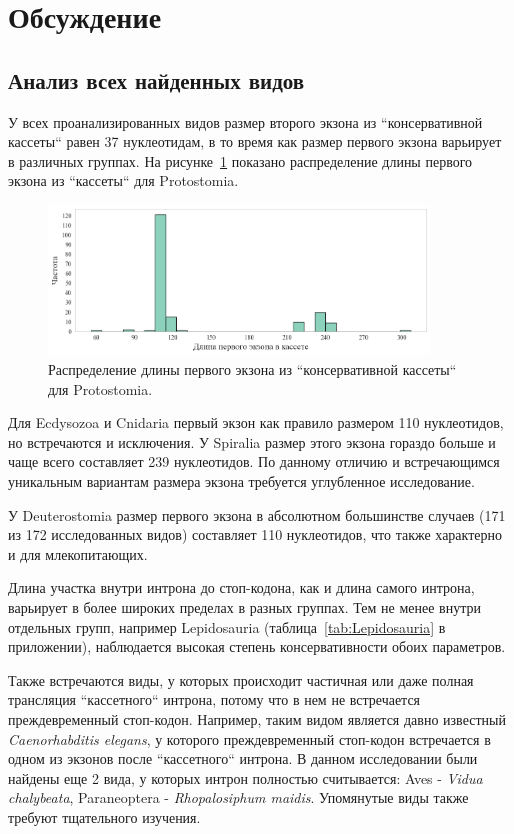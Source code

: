 \clearpage
\section{Обсуждение}

\subsection{Анализ всех найденных видов}

У всех проанализированных видов размер второго экзона из ``консервативной кассеты`` равен 37 нуклеотидам, в то время как размер первого экзона варьирует в различных группах.
На рисунке~\ref{fig:Protostomia_exon} показано распределение длины первого экзона из ``кассеты`` для Protostomia.

\begin{figure}[h] %
    \centering
    \includegraphics[width=0.9\textwidth]{images/Protostomia_exon}
    \caption{Распределение длины первого экзона из ``консервативной кассеты`` для Protostomia.}
    \label{fig:Protostomia_exon}
\end{figure}

Для Ecdysozoa и Cnidaria первый экзон как правило размером 110 нуклеотидов, но встречаются и исключения.
У Spiralia размер этого экзона гораздо больше и чаще всего составляет 239 нуклеотидов.
По данному отличию и встречающимся уникальным вариантам размера экзона требуется углубленное исследование.

У Deuterostomia размер первого экзона в абсолютном большинстве случаев (171 из 172 исследованных видов) составляет 110 нуклеотидов, что также характерно и для млекопитающих.

Длина участка внутри интрона до стоп-кодона, как и длина самого интрона, варьирует в более широких пределах в разных группах.
Тем не менее внутри отдельных групп, например Lepidosauria (таблица~\ref{tab:Lepidosauria} в приложении), наблюдается высокая степень консервативности обоих параметров.

Также встречаются виды, у которых происходит частичная или даже полная трансляция ``кассетного`` интрона, потому что в нем не встречается преждевременный стоп-кодон.
Например, таким видом является давно известный \textit{Caenorhabditis elegans}, у которого преждевременный стоп-кодон встречается в одном из экзонов после ``кассетного`` интрона.
В данном исследовании были найдены еще 2 вида, у которых интрон полностью считывается: Aves - \textit{Vidua chalybeata}, Paraneoptera - \textit{Rhopalosiphum maidis}.
Упомянутые виды также требуют тщательного изучения.


